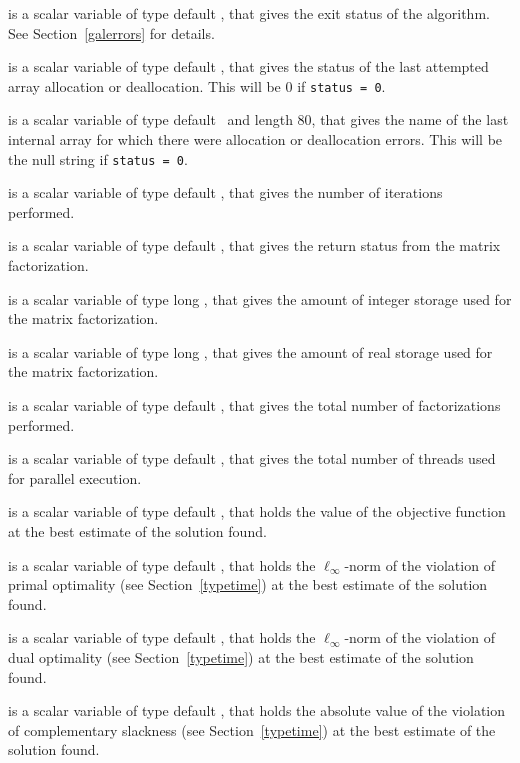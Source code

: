 \begin{description}

 is a scalar variable of type default \integer, that gives the
exit status of the algorithm.
See Section~\ref{galerrors}
for details.

 is a scalar variable of type default \integer, that gives
the status of the last attempted array allocation or deallocation.
This will be 0 if {\tt status = 0}.

 is a scalar variable of type default \character\
and length 80, that  gives the name of the last internal array
for which there were allocation or deallocation errors.
This will be the null string if {\tt status = 0}.

 is a scalar variable of type default \integer, that
gives the number of iterations performed.

 is a scalar variable of type default \integer, that
gives the return status from the matrix factorization.

 is a scalar variable of type long
\integer, that gives the amount of integer storage used for the matrix
factorization.

 is a scalar variable of type long \integer,
that gives the amount of real storage used for the matrix factorization.

 is a scalar variable of type default \integer, that gives the
total number of factorizations performed.

 is a scalar variable of type default \integer, that gives the
total number of threads used for parallel execution.

 is a scalar variable of type default \realdp, that holds the
value of the objective function at the best estimate of the solution found.

 is a scalar variable of type default \realdp,
that holds the $\ell_{\infty}$-norm of the violation of primal optimality
(see Section~\ref{typetime}) at the best estimate of the solution found.

 is a scalar variable of type default \realdp,
that holds the $\ell_{\infty}$-norm of the violation of dual optimality
(see Section~\ref{typetime}) at the best estimate of the solution found.

is a scalar variable of type default \realdp,
that holds the absolute value of the violation of complementary slackness
(see Section~\ref{typetime}) at the best estimate of the solution found.


\end{description}
